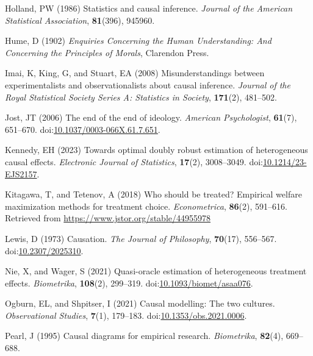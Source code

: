 \documentclass[
  singlecolumn]{article}
\newlength{\cslhangindent}
\newenvironment{CSLReferences}[2] %
 {\begin{list}{}{%
  \setlength{\itemindent}{0pt}
  \setlength{\leftmargin}{0pt}
  \setlength{\parsep}{0pt}
  \ifodd #1
   \setlength{\leftmargin}{\cslhangindent}
   \setlength{\itemindent}{-1\cslhangindent}
  \fi
  \setlength{\itemsep}{#2\baselineskip}}}
 {\end{list}}
\begin{document}
\begin{CSLReferences}{1}{0}
Holland, PW (1986) Statistics and causal inference. \emph{Journal of the
American Statistical Association}, \textbf{81}(396), 945960.

Hume, D (1902) \emph{Enquiries Concerning the Human Understanding: And
Concerning the Principles of Morals}, Clarendon Press.

Imai, K, King, G, and Stuart, EA (2008) Misunderstandings between
experimentalists and observationalists about causal inference.
\emph{Journal of the Royal Statistical Society Series A: Statistics in
Society}, \textbf{171}(2), 481--502.

Jost, JT (2006) The end of the end of ideology. \emph{American
Psychologist}, \textbf{61}(7), 651--670.
doi:\href{https://doi.org/10.1037/0003-066X.61.7.651}{10.1037/0003-066X.61.7.651}.

Kennedy, EH (2023) Towards optimal doubly robust estimation of
heterogeneous causal effects. \emph{Electronic Journal of Statistics},
\textbf{17}(2), 3008--3049.
doi:\href{https://doi.org/10.1214/23-EJS2157}{10.1214/23-EJS2157}.

Kitagawa, T, and Tetenov, A (2018) Who should be treated? Empirical
welfare maximization methods for treatment choice. \emph{Econometrica},
\textbf{86}(2), 591--616. Retrieved from
\url{https://www.jstor.org/stable/44955978}

Lewis, D (1973) Causation. \emph{The Journal of Philosophy},
\textbf{70}(17), 556--567.
doi:\href{https://doi.org/10.2307/2025310}{10.2307/2025310}.

Nie, X, and Wager, S (2021) Quasi-oracle estimation of heterogeneous
treatment effects. \emph{Biometrika}, \textbf{108}(2), 299--319.
doi:\href{https://doi.org/10.1093/biomet/asaa076}{10.1093/biomet/asaa076}.

Ogburn, EL, and Shpitser, I (2021) Causal modelling: The two cultures.
\emph{Observational Studies}, \textbf{7}(1), 179--183.
doi:\href{https://doi.org/10.1353/obs.2021.0006}{10.1353/obs.2021.0006}.

Pearl, J (1995) Causal diagrams for empirical research.
\emph{Biometrika}, \textbf{82}(4), 669--688.


\end{CSLReferences}
\end{document}
